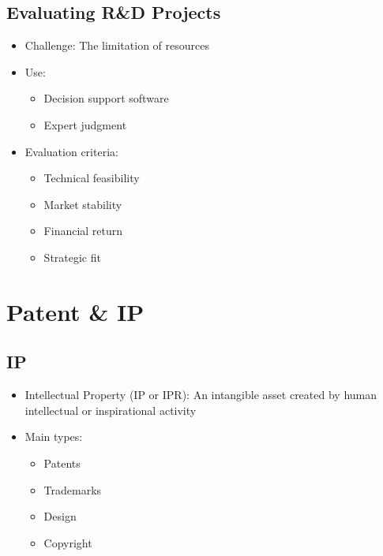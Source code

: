 \documentclass[openany,12pt,a4paper]{book}
\begin{document}
\section{Evaluating R\&D Projects}
\begin{itemize}
    \item Challenge: The limitation of resources
    \item Use:
    \begin{itemize}
        \item Decision support software
        \item Expert judgment
    \end{itemize}
    \item Evaluation criteria:
    \begin{itemize}
        \item Technical feasibility
        \item Market stability
        \item Financial return
        \item Strategic fit
    \end{itemize}
\end{itemize}

\chapter{Patent \& IP}
\section{IP}
\begin{itemize}
    \item Intellectual Property (IP or IPR): An intangible asset created by human intellectual or inspirational activity
    \item Main types:
    \begin{itemize}
        \item Patents
        \item Trademarks
        \item Design
        \item Copyright
    \end{itemize}
\end{itemize}
\end{document}

